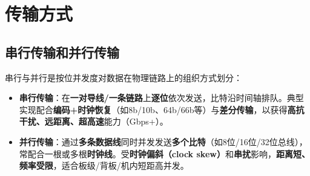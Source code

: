 \documentclass[lang=cn,newtx,10pt,scheme=chinese]{../../elegantbook}
\begin{document}
\begin{center}
{\setlength{\fboxsep}{6pt}%
}%
\end{center}

\section{传输方式}
\subsection{串行传输和并行传输}
串行与并行是按位并发度对数据在物理链路上的组织方式划分：
\begin{itemize}
    \item \textbf{串行传输}：在\textbf{一对导线/一条链路}上\textbf{逐位}依次发送，比特沿时间轴排队。典型实现配合\textbf{编码+时钟恢复}（如8b/10b、64b/66b等）与\textbf{差分传输}，以获得\textbf{高抗干扰、远距离、超高速}能力（Gbps+）。
    \item \textbf{并行传输}：通过\textbf{多条数据线}同时并发发送\textbf{多个比特}（如8位/16位/32位总线），常配合一根或多根\textbf{时钟线}。受\textbf{时钟偏斜（clock skew）}和\textbf{串扰}影响，\textbf{距离短、频率受限}，适合板级/背板/机内短距高并发。
\end{itemize}
\end{document}
